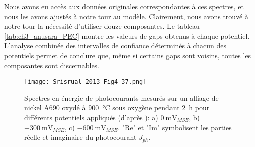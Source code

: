 \begin{refsection}
    Nous avons eu accès aux données originales correspondantes à ces spectres, et nous les avons ajustés à notre tour au
    modèle. Clairement, nous avons trouvé à notre tour la nécessité d'utiliser douze composantes. Le tableau
    \ref{tab:ch3_anusara_PEC} montre
    les valeurs de gaps obtenus à chaque potentiel. L'analyse combinée des intervalles de confiance déterminés à chacun
    des potentiels permet de conclure que, même si certains gaps sont voisins, toutes les composantes sont discernables.

    \newpage
    \begin{figure}[H]
        \centering
        \texttt{[image: Srisrual\_2013-Fig4\_37.png]}
        \caption[Spectres en énergie de photocourants mesurés sur un alliage de nickel A690 oxydé à \SI{900}{\degreeCelsius}
        sous oxygène pendant 2~h pour différents potentiels appliqués:
        a) $\SI{0}{\milli\volt}_{MSE}$,
        b) $\SI{-300}{\milli\volt}_{MSE}$,
        c) $\SI{-600}{\milli\volt}_{MSE}$. "Re" et "Im" symbolisent les parties réelle et imaginaire du photocourant
        $J_{ph}$.]
        {Spectres en énergie de photocourants mesurés sur un alliage de nickel A690 oxydé à \SI{900}{\degreeCelsius}
        sous oxygène pendant 2~h pour différents potentiels appliqués (d'après \citet{Srisrual2013}):
        a) $\SI{0}{\milli\volt}_{MSE}$,
        b) $\SI{-300}{\milli\volt}_{MSE}$,
        c) $\SI{-600}{\milli\volt}_{MSE}$. "Re" et "Im" symbolisent les parties réelle et imaginaire du photocourant
        $J_{ph}$.}
        \label{fig:ch3_anusara_PEC}
    \end{figure}
    \newpage



\end{refsection}
